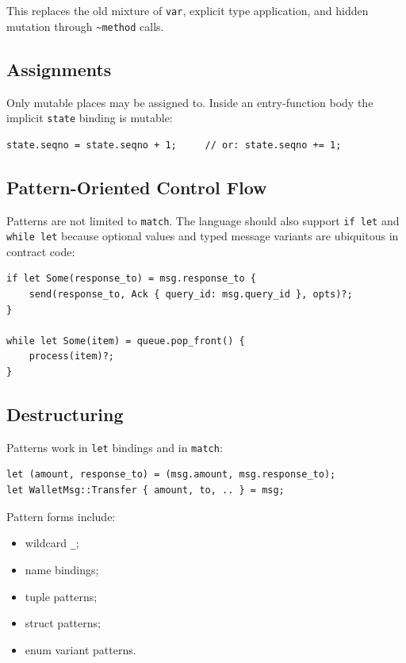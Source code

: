 \documentclass[12pt,oneside]{article}
\begin{document}
This replaces the old mixture of \verb|var|, explicit type application, and
hidden mutation through \verb|~method| calls.

\subsection{Assignments}
Only mutable places may be assigned to. Inside an entry-function body
the implicit \verb|state| binding is mutable:

\begin{verbatim}
state.seqno = state.seqno + 1;     // or: state.seqno += 1;
\end{verbatim}

\subsection{Pattern-Oriented Control Flow}
Patterns are not limited to \verb|match|. The language should also support
\verb|if let| and \verb|while let| because optional values and typed message
variants are ubiquitous in contract code:

\begin{verbatim}
if let Some(response_to) = msg.response_to {
    send(response_to, Ack { query_id: msg.query_id }, opts)?;
}

while let Some(item) = queue.pop_front() {
    process(item)?;
}
\end{verbatim}

\subsection{Destructuring}
Patterns work in \verb|let| bindings and in \verb|match|:

\begin{verbatim}
let (amount, response_to) = (msg.amount, msg.response_to);
let WalletMsg::Transfer { amount, to, .. } = msg;
\end{verbatim}

Pattern forms include:

\begin{itemize}
\item wildcard \verb|_|;
\item name bindings;
\item tuple patterns;
\item struct patterns;
\item enum variant patterns.
\end{itemize}
\end{document}
